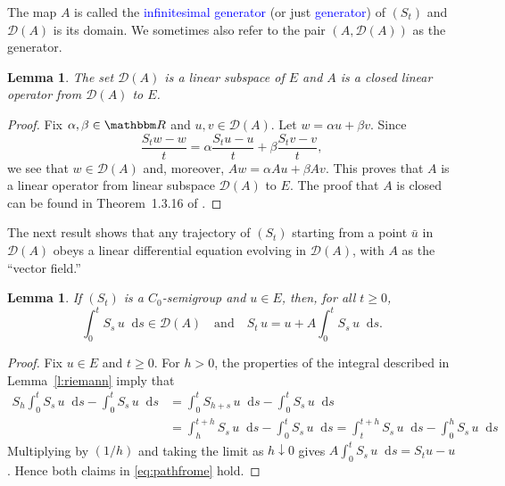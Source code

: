 \documentclass[12pt, reqno]{amsart}
\renewcommand{\geq}{\geqslant}
\newcommand{\1}{\mathbbm 1}
\newcommand*\diff{\mathop{}\!\mathrm{d}}
\newcommand{\dD}{\mathcal D}
\newcommand{\RR}{\mathbbm R}
\theoremstyle{plain}
\newtheorem{lemma}[theorem]{Lemma}
\theoremstyle{definition}
\newcommand{\navy}[1]{\textcolor{blue}{#1}}
\begin{document}
The map $A$ is called the \navy{infinitesimal generator} (or just
\navy{generator}) of $(S_t)$ and $\dD(A)$
is its domain.  We sometimes also refer to the pair $(A, \dD(A))$ as the
generator.

\begin{lemma}\label{l:dals}
    The set $\dD(A)$ is a linear subspace of $E$ and $A$ is a closed linear
    operator from $\dD(A)$ to $E$.
\end{lemma}

\begin{proof}
    Fix $\alpha, \beta \in \RR$ and $u,v \in \dD(A)$.  Let $w = \alpha u + \beta v$.
    Since
    \begin{equation*}
        \frac{S_t w - w}{t} 
        = \alpha \frac{S_t  u - u}{t} + \beta \frac{S_t  v - v}{t},
    \end{equation*}
    we see that $w \in \dD(A)$ and, moreover, $Aw = \alpha Au + \beta Av$.
    This proves that $A$ is a linear operator from linear subspace $\dD(A)$ to
    $E$.  The proof that $A$ is closed can be found in Theorem~1.3.16 of
    \cite{applebaum2019semigroups}.
\end{proof}

The next result shows that any trajectory of $(S_t)$ starting from a point $\bar
u$ in $\dD(A)$ obeys a linear differential equation evolving in $\dD(A)$, with $A$
as the ``vector field.''


\begin{lemma}\label{l:diffpath}
    If $(S_t)$ is a $C_0$-semigroup and $u \in E$,  then, for all $t \geq 0$,
    \begin{equation}\label{eq:pathfrome}
        \int_0^t S_s \, u \diff s \in \dD(A) \quad \text{and} \quad
        S_t \, u = u + A \int_0^t S_s \, u \diff s.
    \end{equation}
\end{lemma}


\begin{proof}
    Fix $u \in E$ and $t \geq 0$.
    For $h > 0$, the properties of the integral described in
    Lemma~\ref{l:riemann} imply that
    \begin{align*}
            S_h \int_0^t S_s \, u \diff s - \int_0^t S_s \, u \diff s
        & = 
            \int_0^t S_{h + s} \, u \diff s - \int_0^t S_s \, u \diff s
        \\
        & = 
            \int_h^{t+h} S_s \, u \diff s - \int_0^t S_s \, u \diff s
        = 
            \int_t^{t+h} S_s \, u \diff s - \int_0^h S_s \, u \diff s
    \end{align*}
    Multiplying by $(1/h)$ and taking the limit as $h
    \downarrow 0$ gives $A \int_0^t S_s \, u \diff s = S_t u - u$. Hence both
    claims in \eqref{eq:pathfrome} hold.
\end{proof}
\end{document}
